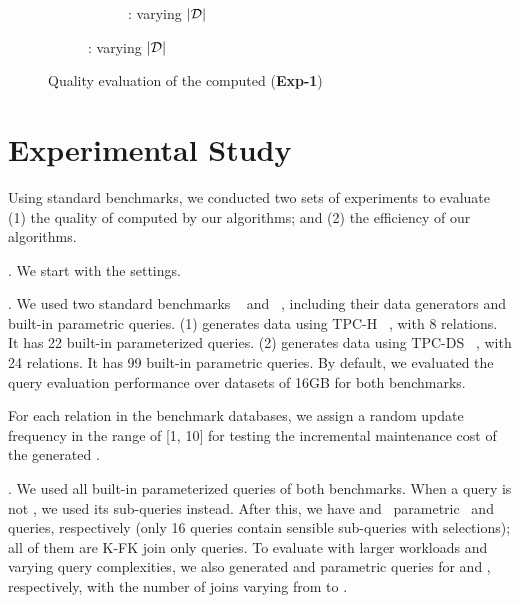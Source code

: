 {\begin{figure}[tb!]
\begin{subfigure}[b]{1.00\textwidth}
\begin{subfigure}[b]{0.245\textwidth}
          \begin{center}
            \vspace{-2ex}\caption{\tpcds: varying $|\mathcal D|$}
            \label{tpcds-1-varyD} 
          \end{center}
          \vspace{-1ex}
        \end{subfigure}
      \end{subfigure}
\caption{Quality evaluation of the computed \bdss ({\bf Exp-1})}
\label{exp-quality}
\end{figure}
    

\section{Experimental Study}
\label{sec-expt}

Using standard benchmarks, we conducted two sets of experiments to evaluate
(1) the quality of \bdss computed by our algorithms; and
(2) the efficiency of our algorithms.


. We start with the settings.

. We used two standard benchmarks
\tpch~\cite{tpch} and \tpcds~\cite{tpcds}, including their 
data generators and built-in parametric queries.
(1) \tpch generates data using {\small TPC-H}
~\cite{tpch}, with 8 relations. It has 22 built-in
parameterized \SQL queries.
(2) \tpcds generates data using {\small
TPC-DS} ~\cite{tpcds}, with 24 relations. It has 99
built-in parametric \SQL queries.
By default, we evaluated the query evaluation performance over
datasets of 16GB for both benchmarks. 

For each relation in the benchmark databases, we assign a random
update frequency in the range of [1, 10] for testing the
incremental maintenance cost of the generated \bdss. 


. We used all built-in
parameterized queries of both benchmarks. When a query is not
\SPC, we used its \SPC sub-queries instead. After this, we have
\xx and \xx\ parametric \SPC\ \tpch and \tpcds queries, respectively (only
16 \tpch queries contain sensible \SPC sub-queries with
selections); all of them are K-FK join only queries. To evaluate
with larger workloads and varying query complexities, we also
generated \xx and \xx parametric \SPC queries for \tpch and \tpcds,
respectively, with the number of joins varying from  to
.


}
